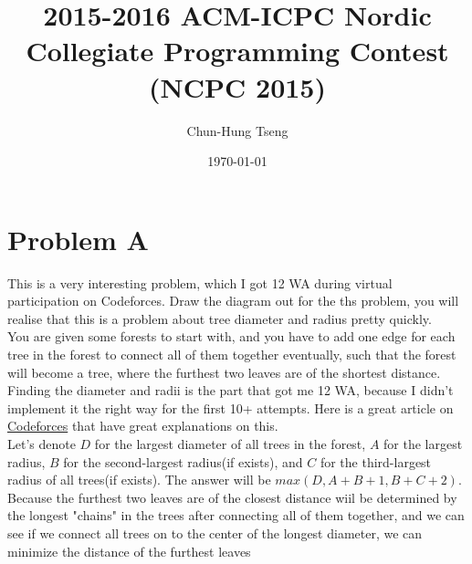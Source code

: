 \documentclass[10pt]{article}
\title{2015-2016 ACM-ICPC Nordic Collegiate Programming Contest (NCPC 2015)} %
\author{Chun-Hung Tseng}
\date{\today}
\begin{document}
 

\begin{titlepage}
\maketitle
\end{titlepage}




\section*{Problem A}

This is a very interesting problem, which I got 12 WA during virtual participation on Codeforces. Draw the diagram out for the ths problem, you will realise that this is a problem about tree diameter and radius pretty quickly. \\

You are given some forests to start with, and you have to add one edge for each tree in the forest to connect all of them together eventually, such that the forest will become a tree, where the furthest two leaves are of the shortest distance.\\ 

Finding the diameter and radii is the part that got me 12 WA, because I didn't implement it the right way for the first 10+ attempts. Here is a great article on \href{http://codeforces.com/blog/entry/17974}{Codeforces} that have great explanations on this. \\

Let's denote $D$ for the largest diameter of all trees in the forest, $A$ for the largest radius, $B$ for the second-largest radius(if exists), and $C$ for the third-largest radius of all trees(if exists). The answer will be $max(D, A+B+1, B+C+2)$. Because the furthest two leaves are of the closest distance wiil be determined by the longest "chains" in the trees after connecting all of them together, and we can see if we connect all trees on to the center of the longest diameter, we can minimize the distance of the furthest leaves\\


\end{document}
